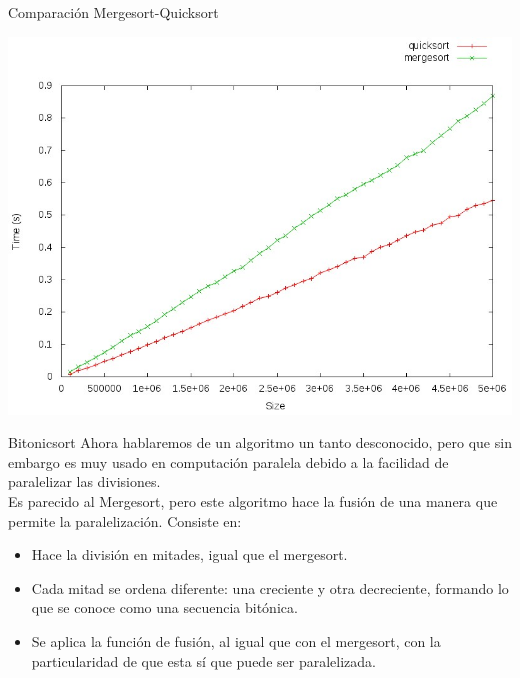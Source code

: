 \documentclass[compress]{beamer}
\begin{document}
\begin{frame}{Comparación Mergesort-Quicksort}
	\begin{alertblock}{}
		\begin{center}
		\includegraphics[scale=0.40]{images/quic-merg.jpeg}
		\end{center}
	\end{alertblock}
\end{frame}

\begin{frame}{Bitonicsort}
Ahora hablaremos de un algoritmo un tanto desconocido, pero que sin embargo es muy usado en computación paralela debido a la facilidad de paralelizar las divisiones.\\
\vspace{0.20in}
Es parecido al Mergesort, pero este algoritmo hace la fusión de una manera que permite la paralelización. Consiste en:\\
\vspace{0.20in}
	\begin{itemize}
	\item Hace la división en mitades, igual que el mergesort.
	\item Cada mitad se ordena diferente: una creciente y otra decreciente, formando lo que se conoce como una secuencia bitónica.
	\item Se aplica la función de fusión, al igual que con el mergesort, con la particularidad de que esta sí que puede ser paralelizada.
	\end{itemize}
\end{frame}
\end{document}
